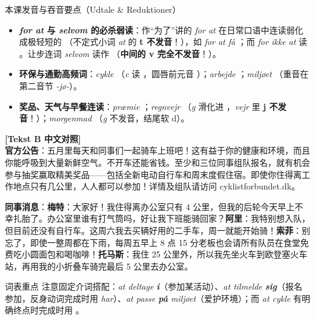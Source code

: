 \begin{tipbox}{本课发音与吞音要点（Udtale \& Reduktioner）}
\begin{itemize}
  \item \textbf{\textit{for at} 与 \textit{selvom} 的必杀弱读}：作“为了”讲的 \textit{for at} 在日常口语中连读弱化成极轻短的 （不定式小词 \textit{at} 的 \textbf{t 不发音}！），如 \textit{for at få} ；而 \textit{for ikke at} 读 。让步连词 \textit{selvom} 读作 （\textbf{中间的 v 完全不发音}！）。
  \item \textbf{环保与通勤高频词}：\textit{cykle} （\textit{c} 读 ，圆唇前元音 ）；\textit{arbejde} ；\textit{miljøet} （重音在第二音节 \textit{-jø-}）。
  \item \textbf{奖品、天气与早餐连读}：\textit{præmie} ；\textit{regnvejr} （\textit{g} 滑化进 ，\textit{vejr} 里 \textbf{j 不发音}！）；\textit{morgenmad} （\textit{g} 不发音，结尾软 d）。
\end{itemize}
\end{tipbox}

\begin{transbox}
\small
\textbf{\color{NCDTeal}[Tekst B 中文对照]}\\
\textbf{官方公告}：五月里每天和同事们一起骑车上班吧！这有益于你的健康和环境，而且你能呼吸到大量新鲜空气。不开车还能省钱。至少和三位同事组队报名，就有机会参与抽奖赢取精美奖品——包括全新电动自行车和周末度假住宿。即使你住得离工作地点只有几公里，人人都可以参加！详情及组队请访问 cyklistforbundet.dk。

\textbf{同事消息}：\textbf{梅特}：大家好！我住得离办公室只有 4 公里，但我的后轮今天早上不幸扎胎了。办公室里谁有打气筒吗，好让我下班能骑回家？\quad \textbf{阿里}：我特别想入队，但目前还没有自行车。这周六我去买辆好用的二手车，周一就能开始骑！\quad \textbf{索菲}：别忘了，即使一整周都在下雨，每周五早上 8 点 15 分老板也会请所有队员在食堂免费吃小圆面包和喝咖啡！\quad \textbf{托马斯}：我住 25 公里外，所以我先坐火车到欧登塞火车站，再用我的小折叠车骑完最后 5 公里去办公室。
\end{transbox}


\begin{tipbox}{词表重点}
注意固定介词搭配：\textit{at deltage \textbf{i}}（参加某活动）、\textit{at tilmelde \textbf{sig}}（报名参加，反身动词完成时用 \textit{har}）、\textit{at passe \textbf{på} miljøet}（爱护环境）；而 \textit{at cykle} 有明确终点时完成时用 。
\end{tipbox}

